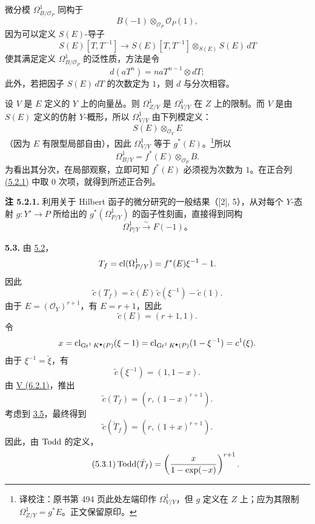 微分模 \(\Omega^1_{B/\mathcal O_P}\) 同构于
\[
 B(-1)\otimes_{\mathcal O_P}\mathcal O_P(1),
\]
因为可以定义 \(S(E)\)-导子
\[
S(E)[T,T^{-1}]
\longrightarrow
S(E)[T,T^{-1}]\otimes_{S(E)}S(E)\,dT
\]
使其满足定义 \(\Omega^1_{B/\mathcal O_P}\) 的泛性质，方法是令
\[
 d(aT^n)=naT^{n-1}\otimes dT;
\]
此外，若把因子 \(S(E)\,dT\) 的次数定为 \(1\)，则 \(d\) 与分次相容。

设 \(V\) 是 \(E\) 定义的 \(Y\) 上的向量丛。则 \(\Omega^1_{Z/Y}\) 是 \(\Omega^1_{V/Y}\) 在 \(Z\) 上的限制。而 \(V\) 是由 \(S(E)\) 定义的仿射 \(Y\)-概形，所以 \(\Omega^1_{V/Y}\) 由下列模定义：
\[
S(E)\otimes_{\mathcal O_Y}E
\]
（因为 \(E\) 有限型局部自由），因此 \(\Omega^1_{V/Y}\) 等于 \(g^*(E)\)。\footnote{译校注：原书第 494 页此处左端印作 \(\Omega^1_{V/Y}\)，但 \(g\) 定义在 \(Z\) 上；应为其限制 \(\Omega^1_{Z/Y}=g^*E\)。正文保留原印。}所以
\[
\Omega^1_{B/Y}=f^*(E)\otimes_{\mathcal O_P}B.
\]
为看出其分次，在局部观察，立即可知 \(f^*(E)\) 必须视为次数为 \(1\)。在正合列 \hyperlink{sga6.e08.eq.5-2-1}{(5.2.1)} 中取 \(0\) 次项，就得到所述正合列。

\textbf{注 5.2.1.} 利用关于 Hilbert 函子的微分研究的一般结果（[2], 5），从对每个 \(Y\)-态射 \(g:Y'\to P\) 所给出的 \(g^*(\Omega^1_{P/Y})\) 的函子性刻画，直接得到同构
\[
\Omega^1_{P/Y}\xrightarrow{\sim}F(-1)
\text{。}
\]


\textbf{5.3.} 由 \hyperlink{sga6.e08.prop.5-2}{5.2}，
\[
 T_f=\operatorname{cl}(\Omega^1_{P/Y})=f^*(E)\xi^{-1}-1.
\]
因此
\[
 \widetilde c(T_f)=\widetilde c(E)\,\widetilde c(\xi^{-1})-\widetilde c(1).
\]
由于 \(E=(\mathcal O_Y)^{r+1}\)，有 \(E=r+1\)，因此
\[
 \widetilde c(E)=(r+1,1).
\]
令
\[
 x=\operatorname{cl}_{\operatorname{Gr}^1K^{\bullet}(P)}(\xi-1)
 =
 \operatorname{cl}_{\operatorname{Gr}^1K^{\bullet}(P)}(1-\xi^{-1})
 =
 c^1(\xi).
\]
由于 \(\xi^{-1}=\check \xi\)，有
\[
 \widetilde c(\xi^{-1})=(1,1-x).
\]
由 \hyperlink{sga6.e05.eq.6-2-1}{V (6.2.1)}，推出
\[
 \widetilde c(T_f)=(r,(1-x)^{r+1}).
\]
考虑到 \hyperlink{sga6.e08.prop.3-5}{3.5}，最终得到
\[
 \widetilde c(\check T_f)=(r,(1+x)^{r+1}).
\]
因此，由 \(\operatorname{Todd}\) 的定义，
\begin{equation}\tag{5.3.1}
 \operatorname{Todd}(\check T_f)=
 \left(\frac{x}{1-\exp(-x)}\right)^{r+1}.
\end{equation}

